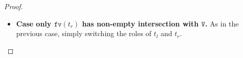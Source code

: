 \documentclass[10pt,a4paper]{article}
\theoremstyle{remark}
\newcommand{\tm}{t}
\newcommand{\var}{x}
\newcommand{\Rew}[1]{\rightarrow_{#1}}
\newcommand{\symfont}[1]{\mathtt{#1}}
\newcommand{\isub}[2]{\{#1{\shortleftarrow}#2\}}
\newcommand{\ih}{{\textit{i.h.}}\xspace}
\newcommand{\fv}[1]{\symfont{fv}(#1)}
\newcommand{\reflemma}[1]{Lemma~\ref{l:#1}}
\newcommand{\reflemmaeq}[1]{{L.\ref{l:#1}}}
\newcommand{\sizep}[2]{|#1|_{#2}}
\newcommand{\case}[1]{{\bf Case #1.}}
\newcommand{\taken}{\circ}
\newcommand{\frontiersym}{\Uparrow}
\newcommand{\skelu}[1]{\overline{#1}^{\frontiersym}}
\newcommand{\appt}{\taken}
\newcommand{\absym}{\symfont{ab}}
\newcommand{\tomarkwhtwo}{\Rew{\absym2}}
\newcommand{\tomark}{\Rew{\symfont{alg}}}
\newcommand{\mtm}{m}
\newcommand{\mtmtwo}{n}
\newcommand{\disc}[2]{\symfont{disc}^{#2}(#1)}
\renewcommand{\disc}[2]{\symfont{mskel}^{#2}(#1)}
\newcommand{\skelvars}{\theta}
\renewcommand{\skelvars}{\symfont{V}}
\newcommand{\sizet}[1]{\sizep{#1}{\taken}}
\begin{document}
\begin{proof}
\begin{itemize}
\begin{itemize}
\begin{itemize}
\item \emph{$\var \notin \fv{\tm_l}$ and $\var\in\fv{\tm_r}$}. By \reflemma{disc-useless-var}, $\var \notin \fv{\tm_l}$ implies $\mtmtwo_l=\disc{\tm_l}{\skelvars \cup \{\var\}} = \disc{\tm_l}{\skelvars} = \mtm_l$. Then:
\[\begin{array}{cllllll}
\mtm\isub\var{\skelu{\var^\taken}}
  &= & 
  \mtm_l\isub\var{\skelu{\var^\taken}}\appt\tm_r\isub\var{\skelu{\var^\taken}} 
\\
  &= & 
  \mtm_l\appt\tm_r\isub\var{\skelu{\var^\taken}} 
  \\
 &=_{\reflemmaeq{disc-useless-var}} &
  \mtmtwo_l\appt\tm_r\isub\var{\skelu{\var^\taken}} 
    \\
   \mbox{(by \ih)}  &\tomark^{k_r} &
\mtmtwo_l \appt \skelu{\mtmtwo_r}
  \\
    &\tomarkwhtwo &
\mtmtwo_l\appt \mtmtwo_r
  &=&
  \mtmtwo
\end{array}\]
where $k_r =_{\ih} \sizet{\mtmtwo_r} - \sizet{\tm_r} -1$.
 Clearly, from $\mtmtwo_l= \mtm_l$ it follows $\sizet{\mtmtwo_l}= \sizet{\mtm_l}$.
Moreover:
\[\begin{array}{lllllll}
k &= & k_r +1
\\
& =_{\ih} & 
\sizet{\mtmtwo_r} - \sizet{\tm_r} -1 +1
\\
& = & 
\sizet{\mtmtwo_r} - \sizet{\tm_r}
\\
& = & 
\sizet{\mtmtwo_l} +\sizet{\mtmtwo_r} - \sizet{\mtm_l} - \sizet{\tm_r}
\\
& = & 
(\sizet{\mtmtwo_l} +\sizet{\mtmtwo_r}+1) - (\sizet{\mtm_l} + \sizet{\tm_r}+1)
\\
& = & 
\sizet{\mtmtwo} - \sizet{\mtm}
\end{array}\]
Then the statement holds, since $\mtm$ starts with $\taken$.
\end{itemize}

\item \case{only $\fv{\tm_r}$ has non-empty intersection with $\skelvars$} As in the previous case, simply switching the roles of $\tm_l$ and $\tm_r$.
\end{itemize}




\end{itemize}
\end{proof}
\end{document}
